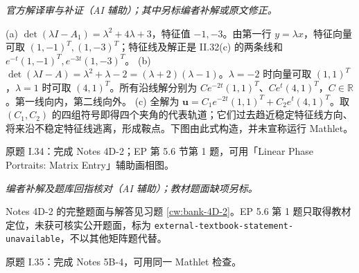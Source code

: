 \begin{solution}
\textit{官方解译审与补证（AI 辅助）；其中另标编者补解或原文修正。}\par

(a) $\det(\lambda I-A_1)=\lambda^2+4\lambda+3$，特征值 $-1,-3$。由第一行 $y=\lambda x$，特征向量可取 $(1,-1)^T,(1,-3)^T$；特征线及解正是 II.32(c) 的两条线和 $e^{-t}(1,-1)^T,e^{-3t}(1,-3)^T$。
(b) $\det(\lambda I-A)=\lambda^2+\lambda-2=(\lambda+2)(\lambda-1)$。$\lambda=-2$ 时向量可取 $(1,1)^T$，$\lambda=1$ 时可取 $(4,1)^T$。所有沿线解分别为 $Ce^{-2t}(1,1)^T$、$Ce^t(4,1)^T$，$C\in\mathbb R$。第一线向内，第二线向外。
(c) 全解为 $\mathbf u=C_1e^{-2t}(1,1)^T+C_2e^t(4,1)^T$。取 $(C_1,C_2)$ 的四组符号即得四个夹角的代表轨道；它们过去趋近稳定特征线方向、将来沿不稳定特征线逃离，形成鞍点。下图由此式构造，并未宣称运行 Mathlet。
\begin{center}\end{center}
\end{solution}
\begin{exercise}\label{cw:ps9-I-34}原题 I.34：完成 Notes 4D-2；EP 第 5.6 节第 1 题，可用「Linear Phase Portraits: Matrix Entry」辅助画相图。\end{exercise}
\begin{solution}
\textit{编者补解及题库回指核对（AI 辅助）；教材题面缺项另标。}\par
Notes 4D-2 的完整题面与解答见习题 \ref{cw:bank-4D-2}。EP 5.6 第 1 题只取得教材定位，未获可核实公开题面，标为 \texttt{external-textbook-statement-unavailable}，不以其他矩阵题代替。\end{solution}
\begin{exercise}\label{cw:ps9-I-35}原题 I.35：完成 Notes 5B-4，可用同一 Mathlet 检查。\end{exercise}
